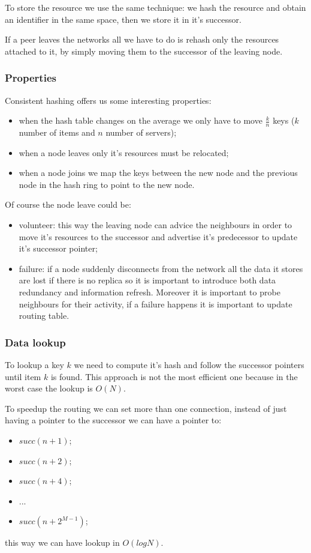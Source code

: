 To store the resource we use the same technique: we hash the resource and obtain an identifier in the same space, then we store it in it's successor.

If a peer leaves the networks all we have to do is rehash only the resources attached to it, by simply moving them to the successor of the leaving node.

\subsubsection{Properties}
Consistent hashing offers us some interesting properties:
\begin{itemize}
    \item when the hash table changes on the average we only have to move $\frac{k}{n}$ keys ($k$ number of items and $n$ number of servers);
    \item when a node leaves only it's resources must be relocated;
    \item when a node joins we map the keys between the new node and the previous node in the hash ring to point to the new node.
\end{itemize}

Of course the node leave could be:
\begin{itemize}
    \item volunteer: this way the leaving node can advice the neighbours in order to move it's resources to the successor and advertise it's predecessor to update it's successor pointer;
    \item failure: if a node suddenly disconnects from the network all the data it stores are lost if there is no replica so it is important to introduce both data redundancy and information refresh.
    Moreover it is important to probe neighbours for their activity, if a failure happens it is important to update routing table.
\end{itemize}

\subsubsection{Data lookup}
To lookup a key $k$ we need to compute it's hash and follow the successor pointers until item $k$ is found.
This approach is not the most efficient one because in the worst case the lookup is $O(N)$.

To speedup the routing we can set more than one connection, instead of just having a pointer to the successor we can have a pointer to:
\begin{itemize}
    \item $succ(n+1)$;
    \item $succ(n+2)$;
    \item $succ(n+4)$;
    \item ...
    \item $succ(n+2^{M-1})$;
\end{itemize}
this way we can have lookup in $O(log N)$.

